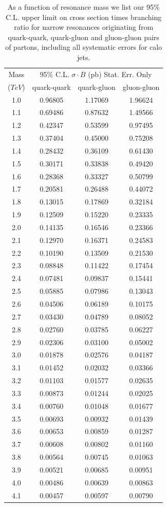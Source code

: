 \clearpage

\begin{table}[htbH]
\centering
\large
\begin{tabular}{|c|c|c|c|}\hline
Mass   &  \multicolumn{3}{c|}{95\% C.L. $\sigma\cdot B$ (pb) Stat. Err. Only}\\
 ($TeV$) & quark-quark       & quark-gluon  & gluon-gluon\\ \hline
1.0 & 0.96805 & 1.17069 & 1.96624 \\
1.1 & 0.69486 & 0.87632 & 1.49566 \\
1.2 & 0.42347 & 0.53599 & 0.97495 \\
1.3 & 0.37404 & 0.45000 & 0.75208 \\
1.4 & 0.28432 & 0.36109 & 0.61430 \\
1.5 & 0.30171 & 0.33838 & 0.49420 \\
1.6 & 0.28368 & 0.33327 & 0.50799 \\
1.7 & 0.20581 & 0.26488 & 0.44072 \\
1.8 & 0.13015 & 0.17869 & 0.32184 \\
1.9 & 0.12509 & 0.15220 & 0.23335 \\
2.0 & 0.14135 & 0.16546 & 0.23366 \\
2.1 & 0.12970 & 0.16371 & 0.24583 \\
2.2 & 0.10190 & 0.13509 & 0.21530 \\
2.3 & 0.08848 & 0.11422 & 0.17454 \\
2.4 & 0.07481 & 0.09837 & 0.15441 \\
2.5 & 0.05885 & 0.07986 & 0.13043 \\
2.6 & 0.04506 & 0.06189 & 0.10175 \\
2.7 & 0.03430 & 0.04789 & 0.08052 \\
2.8 & 0.02760 & 0.03785 & 0.06227 \\
2.9 & 0.02306 & 0.03100 & 0.05002 \\
3.0 & 0.01878 & 0.02576 & 0.04187 \\
3.1 & 0.01452 & 0.02032 & 0.03366 \\
3.2 & 0.01103 & 0.01577 & 0.02635 \\
3.3 & 0.00873 & 0.01244 & 0.02025 \\
3.4 & 0.00760 & 0.01048 & 0.01677 \\
3.5 & 0.00693 & 0.00932 & 0.01439 \\
3.6 & 0.00653 & 0.00859 & 0.01287 \\
3.7 & 0.00608 & 0.00802 & 0.01160 \\
3.8 & 0.00564 & 0.00745 & 0.01063 \\
3.9 & 0.00521 & 0.00685 & 0.00951 \\
4.0 & 0.00486 & 0.00639 & 0.00863 \\
4.1 & 0.00457 & 0.00597 & 0.00790 \\
\hline
\end{tabular}
\caption{As a function of resonance mass we list our 95\% C.L. upper limit on
cross section times branching ratio for narrow resonances originating from
quark-quark, quark-gluon and gluon-gluon pairs of partons, 
including all systematic errors for calo jets.}
\label{tabSysLimit_fat}
\end{table}

\clearpage
